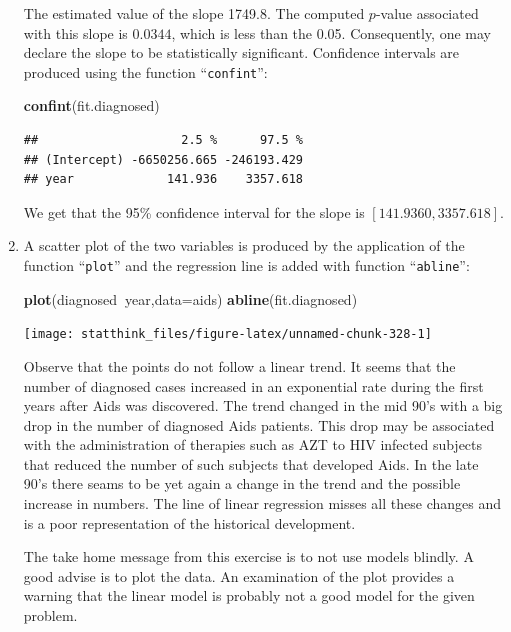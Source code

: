 \documentclass[
]{krantz}
\makeatletter
\newenvironment{Shaded}{\begin{snugshade}}{\end{snugshade}}
\newcommand{\DataTypeTok}[1]{\textcolor[rgb]{0.13,0.29,0.53}{#1}}
\newcommand{\KeywordTok}[1]{\textcolor[rgb]{0.13,0.29,0.53}{\textbf{#1}}}
\newcommand{\NormalTok}[1]{#1}
\newcommand{\OperatorTok}[1]{\textcolor[rgb]{0.81,0.36,0.00}{\textbf{#1}}}
\newenvironment{kframe}{%
\medskip{}
\setlength{\fboxsep}{.8em}
 \def\at@end@of@kframe{}%
 \ifinner\ifhmode%
  \def\at@end@of@kframe{\end{minipage}}%
  \begin{minipage}{\columnwidth}%
 \fi\fi%
 \def\FrameCommand##1{\hskip\@totalleftmargin \hskip-\fboxsep
 \colorbox{shadecolor}{##1}\hskip-\fboxsep
     \hskip-\linewidth \hskip-\@totalleftmargin \hskip\columnwidth}%
 \MakeFramed {\advance\hsize-\width
   \@totalleftmargin\z@ \linewidth\hsize
   \@setminipage}}%
 {\par\unskip\endMakeFramed%
 \at@end@of@kframe}
\renewenvironment{Shaded}{\begin{kframe}}{\end{kframe}}
\theoremstyle{definition}
\theoremstyle{definition}
\theoremstyle{definition}
\theoremstyle{remark}
\makeatother
\begin{document}
\begin{enumerate}
  The estimated value of the slope 1749.8. The computed \(p\)-value
  associated with this slope is \(0.0344\), which is less than the 0.05.
  Consequently, one may declare the slope to be statistically significant.
  Confidence intervals are produced using the function ``\texttt{confint}'':

\begin{Shaded}
\begin{Highlighting}[]
\KeywordTok{confint}\NormalTok{(fit.diagnosed)}
\end{Highlighting}
\end{Shaded}

\begin{verbatim}
##                    2.5 %      97.5 %
## (Intercept) -6650256.665 -246193.429
## year             141.936    3357.618
\end{verbatim}

  We get that the 95\% confidence interval for the slope is
  \([141.9360, 3357.618]\).
\item
  A scatter plot of the two
  variables is produced by the application of the function ``\texttt{plot}'' and
  the regression line is added with function ``\texttt{abline}'':

\begin{Shaded}
\begin{Highlighting}[]
\KeywordTok{plot}\NormalTok{(diagnosed}\OperatorTok{~}\NormalTok{year,}\DataTypeTok{data=}\NormalTok{aids)}
\KeywordTok{abline}\NormalTok{(fit.diagnosed)}
\end{Highlighting}
\end{Shaded}

  \begin{center}\texttt{[image: statthink\_files/figure-latex/unnamed-chunk-328-1]} \end{center}

  Observe that the
  points do not follow a linear trend. It seems that the number of
  diagnosed cases increased in an exponential rate during the first years
  after Aids was discovered. The trend changed in the mid 90's with a big
  drop in the number of diagnosed Aids patients. This drop may be
  associated with the administration of therapies such as AZT to HIV
  infected subjects that reduced the number of such subjects that
  developed Aids. In the late 90's there seams to be yet again a change in
  the trend and the possible increase in numbers. The line of linear
  regression misses all these changes and is a poor representation of the
  historical development.

  The take home message from this exercise is to not use models blindly. A
  good advise is to plot the data. An examination of the plot provides a
  warning that the linear model is probably not a good model for the given
  problem.
\end{enumerate}
\end{document}
